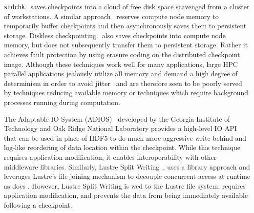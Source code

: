





{\tt stdchk}~\cite{stdchk} saves checkpoints into a cloud of free disk space
scavenged from a cluster of workstations.  A similar
approach~\cite{aggregate-memory} reserves compute node memory to temporarily
buffer checkpoints and then asynchronously saves them to persistent storage.
Diskless checkpointing~\cite{diskless} also  
saves checkpoints into compute node memory, but does not subsequently transfer
them to persistent storage.  Rather it achieves fault protection by using erasure 
coding on the distributed checkpoint image. 
Although these techniques work well for many applications, large HPC parallel
applications jealously utilize all memory and demand a high degree of
determinism in order to avoid jitter~\cite{DusseauPhd98} and are therefore seen
to be poorly served by techniques reducing available memory or techniques which
require background processes running during computation.

The Adaptable IO System (ADIOS)~\cite{adios} developed by the Georgia Institute
of Technology and Oak Ridge National Laboratory provides a high-level IO API
that can be used in place of HDF5 to do much more aggressive write-behind and
log-like reordering of data location within the checkpoint. While this technique
requires application modification, it enables interoperability with other
middleware libraries.  Similarly, Lustre Split Writing~\cite{lsw}, uses a 
library approach and leverages Lustre's file joining mechanism to decouple
concurrent access at runtime as does \plfs.  However, Lustre Split Writing is
wed to the Lustre file system, requires application modification, and prevents
the data from being immediately available following a checkpoint.

